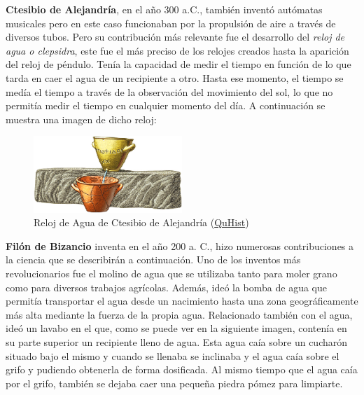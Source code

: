 \textbf{Ctesibio de Alejandría}, en el año 300 a.C., también inventó autómatas musicales pero en este caso funcionaban por la propulsión de aire a través de diversos tubos. Pero su contribución más relevante fue el desarrollo del \textit{reloj de agua o clepsidra}, este fue el más preciso de los relojes creados hasta la aparición del reloj de péndulo. Tenía la capacidad de medir el tiempo en función de lo que tarda en caer el agua de un recipiente a otro. Hasta ese momento, el tiempo se medía el tiempo a través de la observación del movimiento del sol, lo que no permitía medir el tiempo en cualquier momento del día. A continuación se muestra una imagen de dicho reloj:\\

	
\begin{figure}[H]
\begin{center}
  \includegraphics[width=0.5\textwidth]{./EtapaPrimeriza/imagenes/reloj.png}
  \caption{Reloj de Agua de Ctesibio de Alejandría (\href{http://quhist.com/origen-a-lo-largo-historia-termino-clepsidra/}{QuHist})}
  \label{reloj}
\end{center}
\end{figure}



\textbf{Filón de Bizancio} inventa en el año 200 a. C., hizo numerosas contribuciones a la ciencia que se describirán a continuación. Uno de los inventos más revolucionarios fue el molino de agua que se utilizaba tanto para moler grano como para diversos trabajos agrícolas. Además, ideó la bomba de agua que permitía transportar el agua desde un nacimiento hasta una zona geográficamente más alta mediante la fuerza de la propia agua. Relacionado también con el agua, ideó un lavabo en el que, como se puede ver en la siguiente imagen, contenía en su parte superior un recipiente lleno de agua. Esta agua caía sobre un cucharón situado bajo el mismo y cuando se llenaba se inclinaba y el agua caía sobre el grifo y pudiendo obtenerla de forma dosificada. Al mismo tiempo que el agua caía por el grifo, también se dejaba caer una pequeña piedra pómez para limpiarte.\\


